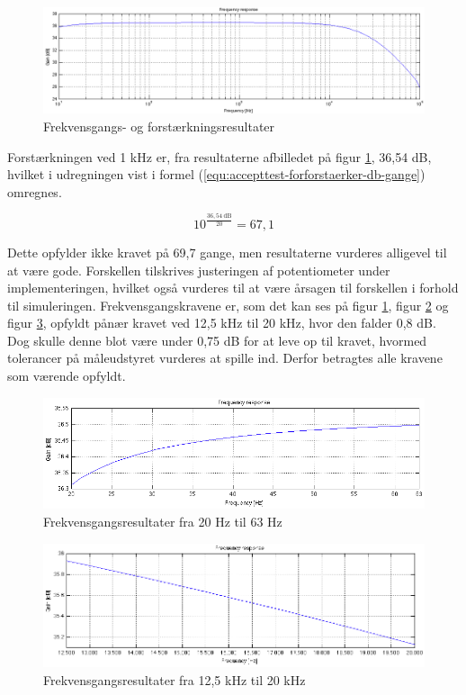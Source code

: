 \begin{figure}[h]
\centering
\includegraphics[width=\textwidth]{maalerapporter/forforstaerker/frekvensrespons-forforstaerker.png}
\caption{Frekvensgangs- og forstærkningsresultater}
\label{fig:accepttest-fresultat-forforstaerker}
\end{figure}

Forstærkningen ved 1 kHz er, fra resultaterne afbilledet på figur \ref{fig:accepttest-fresultat-forforstaerker}, 36,54 dB, hvilket i udregningen vist i formel (\ref{equ:accepttest-forforstaerker-db-gange}) omregnes.

\begin{equation}
\label{equ:accepttest-forforstaerker-db-gange}
10^{\frac{\mathrm{36,54~dB}}{20}} = 67,1
\end{equation}

Dette opfylder ikke kravet på 69,7 gange, men resultaterne vurderes alligevel til at være gode. Forskellen tilskrives justeringen af potentiometer under implementeringen, hvilket også vurderes til at være årsagen til forskellen i forhold til simuleringen. Frekvensgangskravene er, som det kan ses på figur \ref{fig:accepttest-fresultat-forforstaerker}, figur \ref{fig:accepttest-fres-20-63} og figur \ref{fig:accepttest-fres-125-20}, opfyldt pånær kravet ved 12,5 kHz til 20 kHz, hvor den falder 0,8 dB. Dog skulle denne blot være under 0,75 dB for at leve op til kravet, hvormed tolerancer på måleudstyret vurderes at spille ind. Derfor betragtes alle kravene som værende opfyldt.

\begin{figure}[h]
\centering
\includegraphics[width=\textwidth]{maalerapporter/forforstaerker/fr20-63.png}
\caption{Frekvensgangsresultater fra 20 Hz til 63 Hz}
\label{fig:accepttest-fres-20-63}
\end{figure}

\begin{figure}[h]
\centering
\includegraphics[width=\textwidth]{maalerapporter/forforstaerker/fr12-20k.png}
\caption{Frekvensgangsresultater fra 12,5 kHz til 20 kHz}
\label{fig:accepttest-fres-125-20}
\end{figure}